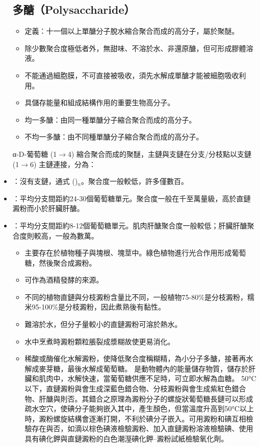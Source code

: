 \documentclass[a4paper,12pt]{report}
\begin{document}
\begin{itemize}
\subsection{多醣（Polysaccharide）}
\begin{itemize}
\item 定義：十一個以上單醣分子脫水縮合聚合而成的高分子，屬於聚醚。
\item 除少數聚合度極低者外，無甜味、不溶於水、非還原醣，但可形成膠體溶液。
\item 不能通過細胞膜，不可直接被吸收，須先水解成單醣才能被細胞吸收利用。
\item 具儲存能量和組成結構作用的重要生物高分子。
\item 均一多醣：由同一種單醣分子縮合聚合而成的高分子。
\item 不均一多醣：由不同種單醣分子縮合聚合而成的高分子。
\end{itemize}
α-D-葡萄糖 (1$\to$4) 縮合聚合而成的聚醚，主鏈與支鏈在分支/分枝點以支鏈 (1$\to$6) 主鏈連接，分為：
\bit
\item {}：沒有支鏈，通式 ()$_n$。聚合度一般較低，許多僅數百。
\item {}：平均分支間距約24-30個葡萄糖單元。聚合度一般在千至萬量級，高於直鏈澱粉而小於肝臟肝醣。
\item {}：平均分支間距約8-12個葡萄糖單元。肌肉肝醣聚合度一般較低；肝臟肝醣聚合度則較高，一般為數萬。
\eit
{}
\begin{itemize}
\item 主要存在於植物種子與塊根、塊莖中。綠色植物進行光合作用形成葡萄糖，然後聚合成澱粉。
\item 可作為酒精發酵的來源。
\item 不同的植物直鏈與分枝澱粉含量比不同，一般植物75-80\%是分枝澱粉，糯米95-100\%是分枝澱粉，因此煮熟後有黏性。
\item 難溶於水，但分子量較小的直鏈澱粉可溶於熱水。
\item 水中烹煮時澱粉顆粒脹裂成漿糊故使更易消化。
\item 稀酸或酶催化水解澱粉，使降低聚合度稱糊精，為小分子多醣，接著再水解成麥芽糖，最後水解成葡萄糖。
\eit
{}
是動物體內的能量儲存物質，儲存於肝臟和肌肉中，水解快速，當葡萄糖供應不足時，可立即水解為血糖。
50°C以下，直鏈澱粉與會生成深藍色錯合物、分枝澱粉與會生成紫紅色錯合物、肝醣與則否。其錯合之原理為澱粉分子的螺旋狀葡萄糖長鏈可以形成疏水空穴，使碘分子能夠嵌入其中，產生顏色，但當溫度升高到50°C以上時，澱粉螺旋結構會逐漸打開，不利於碘分子嵌入。可用澱粉和碘互相檢驗存在與否，如滴以棕色碘液檢驗澱粉、加入直鏈澱粉溶液檢驗碘、使用具有碘化鉀與直鏈澱粉的白色潮溼碘化鉀–澱粉試紙檢驗氧化劑。

\end{itemize}
\end{itemize}
\end{document}

